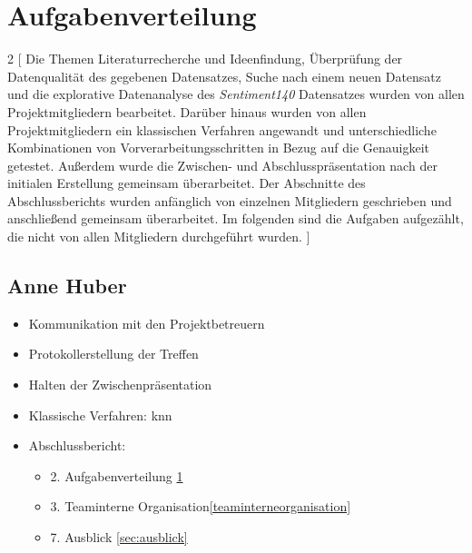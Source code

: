 \section{Aufgabenverteilung}\label{sec:aufgabenverteilung}

\begin{multicols}{2}
[
Die Themen Literaturrecherche und Ideenfindung, Überprüfung der Datenqualität des gegebenen Datensatzes, Suche nach einem neuen Datensatz und die explorative Datenanalyse des \textit{Sentiment140} Datensatzes wurden von allen Projektmitgliedern bearbeitet.
Darüber hinaus wurden von allen Projektmitgliedern ein klassischen Verfahren angewandt und unterschiedliche Kombinationen von Vorverarbeitungsschritten in Bezug auf die Genauigkeit getestet.
Außerdem wurde die Zwischen- und Abschlusspräsentation nach der initialen Erstellung gemeinsam überarbeitet.
Der Abschnitte des Abschlussberichts wurden anfänglich von einzelnen Mitgliedern geschrieben und anschließend gemeinsam überarbeitet.
Im folgenden sind die Aufgaben aufgezählt, die nicht von allen Mitgliedern durchgeführt wurden.
]

\subsection{Anne Huber}
\begin{itemize}
    \item Kommunikation mit den Projektbetreuern
    \item Protokollerstellung der Treffen
    \item Halten der Zwischenpräsentation
    \item Klassische Verfahren: \gls{knn}
    \item Abschlussbericht: 
    \begin{itemize}
        \item 2. Aufgabenverteilung \ref{sec:aufgabenverteilung}
        \item 3. Teaminterne Organisation\ref{teaminterneorganisation}
        \item 7. Ausblick \ref{sec:ausblick}
    \end{itemize}
\end{itemize}



\end{multicols}
